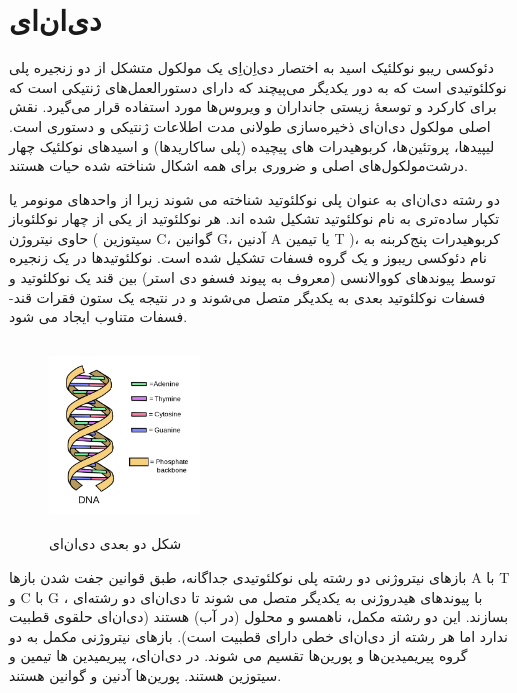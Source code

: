 \documentclass[12pt,a4paper,BCOR=.7cm,headsepline,bibliography=totoc]{report}
\begin{document}
\section{دی‌ان‌ای}

دئوکسی ریبو نوکلئیک اسید به اختصار دی‌اِن‌اِی یک مولکول متشکل از دو زنجیره پلی نوکلئوتیدی است که به دور یکدیگر می‌پیچند که دارای دستورالعمل‌های ژنتیکی است که برای کارکرد و توسعهٔ زیستی جانداران و ویروس‌ها مورد استفاده قرار می‌گیرد. نقش اصلی مولکول دی‌ان‌ای ذخیره‌سازی طولانی مدت اطلاعات ژنتیکی و دستوری است. لیپید‌ها، پروتئین‌ها، کربوهیدرات های پیچیده (پلی ساکاریدها) و اسیدهای نوکلئیک چهار درشت‌مولکول‌های اصلی و ضروری برای همه اشکال شناخته شده حیات هستند.

دو رشته دی‌ان‌ای به عنوان پلی نوکلئوتید شناخته می شوند زیرا از واحدهای مونومر یا تکپار ساده‌تری به نام نوکلئوتید تشکیل شده اند. هر نوکلئوتید از یکی از چهار نوکلئوباز حاوی نیتروژن ( سیتوزین C، گوانین G، آدنین A یا تیمین T )،  کربوهیدرات پنج‌کربنه به نام دئوکسی ریبوز و یک گروه فسفات تشکیل شده است. نوکلئوتیدها در یک زنجیره توسط پیوندهای کووالانسی (معروف به پیوند فسفو دی استر) بین قند یک نوکلئوتید و فسفات نوکلئوتید بعدی به یکدیگر متصل می‌شوند و در نتیجه یک ستون فقرات قند-فسفات متناوب ایجاد می شود.
\begin{figure}
\centering
\includegraphics[width=4cm, height=5cm]{pictures/DNApng.png}
\caption{
شکل دو بعدی دی‌ان‌ای \cite{graph1}
}\label{wrap-fig:2}
\end{figure}
 بازهای نیتروژنی دو رشته پلی نوکلئوتیدی جداگانه، طبق قوانین جفت شدن باز‌ها 
\lr{)}A با T و C با G\lr{(}
، با پیوندهای هیدروژنی به یکدیگر متصل می شوند تا دی‌ان‌ای دو رشته‌ای بسازند. این دو رشته مکمل، ناهمسو و محلول (در آب) هستند (دی‌ان‌ای حلقوی قطبیت ندارد اما هر رشته از دی‌ان‌ای خطی دارای قطبیت است). بازهای نیتروژنی مکمل به دو گروه پیریمیدین‌ها و پورین‌ها تقسیم می شوند. در دی‌ان‌ای، پیریمیدین ها تیمین و سیتوزین هستند. پورین‌ها آدنین و گوانین هستند.
\end{document}
